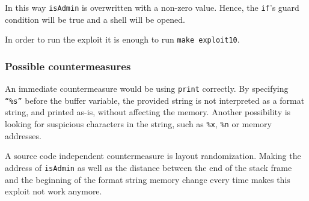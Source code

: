 In this way \texttt{isAdmin} is overwritten with a non-zero value. Hence, the \texttt{if}'s guard condition will be true and a shell will be opened.

In order to run the exploit it is enough to run \texttt{make exploit10}.

\subsubsection{Possible countermeasures}
An immediate countermeasure would be using \texttt{print} correctly. By specifying \texttt{``\%s''} before the buffer variable, the provided string is not interpreted as a format string, and printed as-is, without affecting the memory. Another possibility is looking for suspicious characters in the string, such as \texttt{\%x}, \texttt{\%n} or memory addresses. 

A source code independent countermeasure is layout randomization. Making the address of \texttt{isAdmin} as well as the distance between the end of the stack frame and the beginning of the format string memory change every time makes this exploit not work anymore. 

